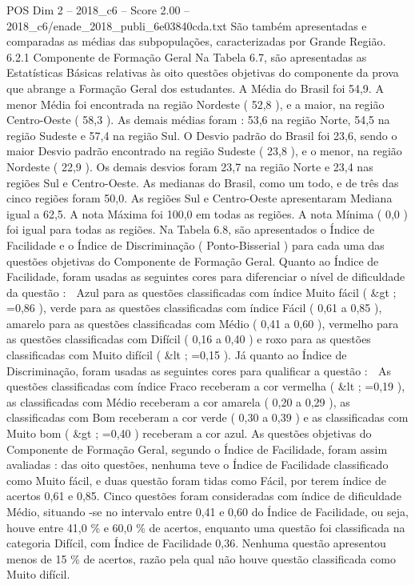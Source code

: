 \begin{textsample}{POS Dim 2 – 2018\_c6 – Score 2.00 – 2018\_c6/enade\_2018\_publi\_6e03840cda.txt}
São também apresentadas e comparadas as médias das subpopulações, caracterizadas por Grande Região. 6.2.1 Componente de Formação Geral Na Tabela 6.7, são apresentadas as Estatísticas Básicas relativas às oito questões objetivas do componente da prova que abrange a Formação Geral dos estudantes.
A Média do Brasil foi 54,9.
A menor Média foi encontrada na região Nordeste ( 52,8 ), e a maior, na região Centro-Oeste ( 58,3 ).
As demais médias foram : 53,6 na região Norte, 54,5 na região Sudeste e 57,4 na região Sul.
O Desvio padrão do Brasil foi 23,6, sendo o maior Desvio padrão encontrado na região Sudeste ( 23,8 ), e o menor, na região Nordeste ( 22,9 ).
Os demais desvios foram 23,7 na região Norte e 23,4 nas regiões Sul e Centro-Oeste.
As medianas do Brasil, como um todo, e de três das cinco regiões foram 50,0.
As regiões Sul e Centro-Oeste apresentaram Mediana igual a 62,5.
A nota Máxima foi 100,0 em todas as regiões.
A nota Mínima ( 0,0 ) foi igual para todas as regiões.
Na Tabela 6.8, são apresentados o Índice de Facilidade e o Índice de Discriminação ( Ponto-Bisserial ) para cada uma das questões objetivas do Componente de Formação Geral.
Quanto ao Índice de Facilidade, foram usadas as seguintes cores para diferenciar o nível de dificuldade da questão :  Azul para as questões classificadas com índice Muito fácil ( \&gt ; =0,86 ), verde para as questões classificadas com índice Fácil ( 0,61 a 0,85 ), amarelo para as questões classificadas com Médio ( 0,41 a 0,60 ), vermelho para as questões classificadas com Difícil ( 0,16 a 0,40 ) e roxo para as questões classificadas com Muito difícil ( \&lt ; =0,15 ).
Já quanto ao Índice de Discriminação, foram usadas as seguintes cores para qualificar a questão :  As questões classificadas com índice Fraco receberam a cor vermelha ( \&lt ; =0,19 ), as classificadas com Médio receberam a cor amarela ( 0,20 a 0,29 ), as classificadas com Bom receberam a cor verde ( 0,30 a 0,39 ) e as classificadas com Muito bom ( \&gt ; =0,40 ) receberam a cor azul.
As questões objetivas do Componente de Formação Geral, segundo o Índice de Facilidade, foram assim avaliadas : das oito questões, nenhuma teve o Índice de Facilidade classificado como Muito fácil, e duas questão foram tidas como Fácil, por terem índice de acertos 0,61 e 0,85.
Cinco questões foram consideradas com índice de dificuldade Médio, situando -se no intervalo entre 0,41 e 0,60 do Índice de Facilidade, ou seja, houve entre 41,0 \% e 60,0 \% de acertos, enquanto uma questão foi classificada na categoria Difícil, com Índice de Facilidade 0,36.
Nenhuma questão apresentou menos de 15 \% de acertos, razão pela qual não houve questão classificada como Muito difícil.

\end{textsample}
